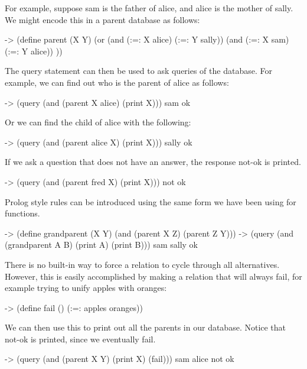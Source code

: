 For example, suppose {\sf sam} is the father of {\sf alice}, and {\sf alice} 
is the mother of {\sf sally}.  We might encode this in a parent database 
as follows:

\begin{cprog}
-> (define parent (X Y)
	(or
		(and (:=: X alice) (:=: Y sally))
		(and (:=: X sam) (:=: Y alice)) 
	))
\end{cprog}

The query statement can then be used to ask queries of the database.
For example, we can find out who is the parent of {\sf alice} as follows:

\begin{cprog}
-> (query (and (parent X alice) (print X)))
sam
ok
\end{cprog}

Or we can find the child of {\sf alice} with the following:

\begin{cprog}
-> (query (and (parent alice X) (print X)))
sally
ok
\end{cprog}

If we ask a question that does not have an answer, the response not-ok is
printed.

\begin{cprog}
-> (query (and (parent fred X) (print X)))
not ok
\end{cprog}

Prolog style rules can be introduced using the same form we have been using
for functions.

\begin{cprog}
-> (define grandparent (X Y)
	(and (parent X Z) (parent Z Y)))
-> (query (and (grandparent A B) (print A) (print B)))
sam
sally
ok
\end{cprog}

There is no built-in way to force a relation to cycle through all
alternatives.  However, this is easily accomplished by making a relation
that will always fail, for example trying to unify apples with oranges:

\begin{cprog}
-> (define fail () (:=: apples oranges))
\end{cprog}

We can then use this to print out all the parents in our database.
Notice that not-ok is printed, since we eventually fail.

\begin{cprog}
-> (query (and (parent X Y) (print X) (fail)))
sam
alice
not ok
\end{cprog}

